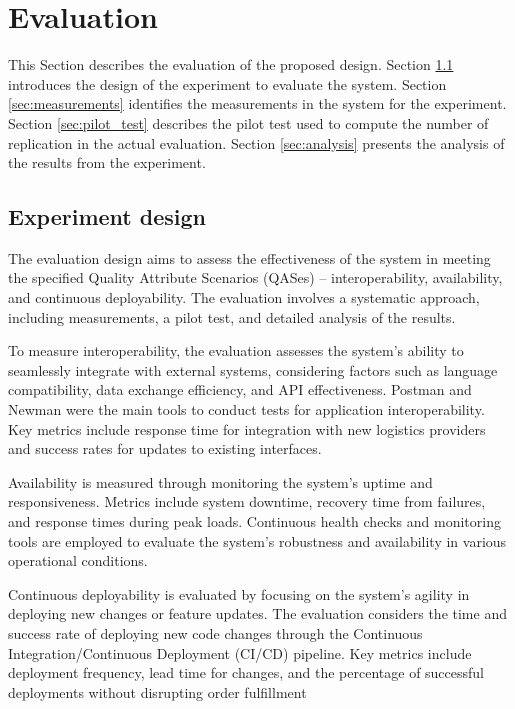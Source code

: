\documentclass[conference]{IEEEtran}
\begin{document}
\section{Evaluation}
\label{sec:evaluation}

This Section describes the evaluation of the proposed design.
Section \ref{sec:design} introduces the design of the experiment to evaluate the system.
Section \ref{sec:measurements} identifies the measurements in the system for the experiment.
Section \ref{sec:pilot_test} describes the pilot test used to compute the number of replication in the actual evaluation. 
Section \ref{sec:analysis} presents the analysis of the results from the experiment. 

 
\subsection{Experiment design}
\label{sec:design}
The evaluation design aims to assess the effectiveness of the system in meeting the specified Quality Attribute Scenarios (QASes) – interoperability, availability, and continuous deployability. The evaluation involves a systematic approach, including measurements, a pilot test, and detailed analysis of the results.

To measure interoperability, the evaluation assesses the system's ability to seamlessly integrate with external systems, considering factors such as language compatibility, data exchange efficiency, and API effectiveness.
Postman and Newman were the main tools to conduct tests for application interoperability.  
Key metrics include response time for integration with new logistics providers and success rates for updates to existing interfaces.

Availability is measured through monitoring the system's uptime and responsiveness. Metrics include system downtime, recovery time from failures, and response times during peak loads. Continuous health checks and monitoring tools are employed to evaluate the system's robustness and availability in various operational conditions.

Continuous deployability is evaluated by focusing on the system's agility in deploying new changes or feature updates. The evaluation considers the time and success rate of deploying new code changes through the Continuous Integration/Continuous Deployment (CI/CD) pipeline. Key metrics include deployment frequency, lead time for changes, and the percentage of successful deployments without disrupting order fulfillment
\end{document}
